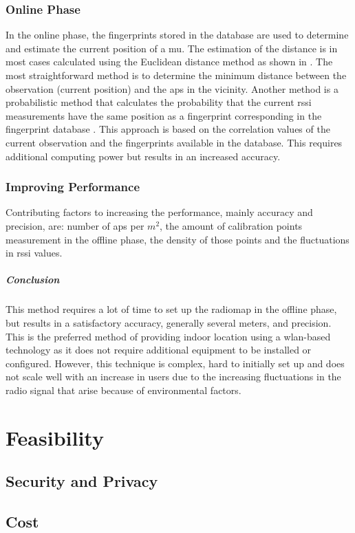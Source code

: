 \subsubsection{Online Phase}
In the online phase, the fingerprints stored in the database are used to determine and estimate the current position of a \acrshort{mu}. The estimation of the distance is in most cases calculated using the Euclidean distance method as shown in \cite{fig:euclidean}. The most straightforward method is to determine the minimum distance between the observation (current position) and the \acrshort{ap}s in the vicinity. Another method is a probabilistic method that calculates the probability that the current \acrlong{rssi} measurements have the same position as a fingerprint corresponding in the fingerprint database \cite{Mautz}. This approach is based on the correlation values of the current observation and the fingerprints available in the database. This requires additional computing power but results in an increased accuracy.
\subsubsection{Improving Performance}
Contributing factors to increasing the performance, mainly accuracy and precision, are: number of \acrshort{ap}s per $m^2$, the amount of calibration points measurement in the offline phase, the density of those points and the fluctuations in  \acrshort{rssi} values.
\subparagraph{Conclusion}
This method requires a lot of time to set up the radiomap in the offline phase, but results in a satisfactory accuracy, generally several meters, and precision. This is the preferred method of providing indoor location using a \acrshort{wlan}-based technology as it does not require additional equipment to be installed or configured. However, this technique is complex, hard to initially set up and does not scale well with an increase in users due to the increasing fluctuations in the radio signal that arise because of environmental factors.
\section{Feasibility}
\subsection{Security and Privacy}
\subsection{Cost}
